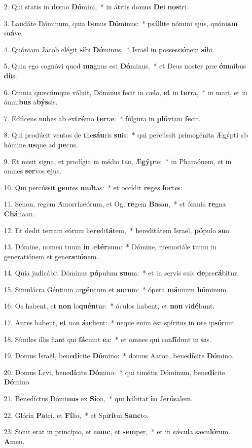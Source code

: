 2. Qui statis in \textbf{do}mo \textbf{Dó}mini,~*  in átriis domus \textbf{De}i \textbf{nos}tri.\

3. Laudáte Dóminum, quia \textbf{bo}nus \textbf{Dó}minus:~*  psállite nómini ejus, quóni\textbf{am} su\textbf{á}ve.\

4. Quóniam Jacob elégit \textbf{si}bi \textbf{Dó}minus,~*  Israël in possessi\textbf{ó}nem \textbf{si}bi.\

5. Quia ego cognóvi quod \textbf{ma}gnus est \textbf{Dó}minus,~*  et Deus noster præ \textbf{óm}nibus \textbf{di}is.\

6. Omnia quæcúmque vóluit, Dóminus fecit in cælo, \textbf{et} in \textbf{ter}ra,~*  in mari, et in ómni\textbf{bus} a\textbf{býs}sis.\

7. Edúcens nubes ab ex\textbf{tré}mo \textbf{ter}ræ:~*  fúlgura in \textbf{plú}viam \textbf{fe}cit.\

8. Qui prodúcit ventos de the\textbf{sáu}ris \textbf{su}is:~*  qui percússit primogénita Ægýpti ab hómine \textbf{us}que ad \textbf{pe}cus.\

9. Et misit signa, et prodígia in médio \textbf{tu}i, Æ\textbf{gýp}te:~*  in Pharaónem, et in omnes \textbf{ser}vos \textbf{e}jus.\

10. Qui percússit \textbf{gen}tes \textbf{mul}tas:~*  et occídit \textbf{re}ges \textbf{for}tes:\

11. Sehon, regem Amorrhæórum, et Og, \textbf{re}gem \textbf{Ba}san,~*  et ómnia \textbf{re}gna \textbf{Chá}naan.\

12. Et dedit terram eórum he\textbf{re}di\textbf{tá}tem,~*  hereditátem Israël, \textbf{pó}pulo \textbf{su}o.\

13. Dómine, nomen tuum \textbf{in} æ\textbf{tér}num:~*  Dómine, memoriále tuum in generatiónem et gene\textbf{ra}ti\textbf{ó}nem.\

14. Quia judicábit Dóminus \textbf{pó}pulum \textbf{su}um:~*  et in servis suis \textbf{de}pre\textbf{cá}bitur.\

15. Simulácra Géntium ar\textbf{gén}tum et \textbf{au}rum:~*  ópera \textbf{má}nuum \textbf{hó}minum.\

16. Os habent, et \textbf{non} lo\textbf{quén}tur:~*  óculos habent, et \textbf{non} vi\textbf{dé}bunt.\

17. Aures habent, \textbf{et} non \textbf{áu}dient:~*  neque enim est spíritus in \textbf{o}re ip\textbf{só}rum.\

18. Símiles illis fiant qui \textbf{fá}ciunt \textbf{e}a:~*  et omnes qui con\textbf{fí}dunt in \textbf{e}is.\

19. Domus Israël, bene\textbf{dí}cite \textbf{Dó}mino:~*  domus Aaron, bene\textbf{dí}cite \textbf{Dó}mino.\

20. Domus Levi, bene\textbf{dí}cite \textbf{Dó}mino:~*  qui timétis Dóminum, bene\textbf{dí}cite \textbf{Dó}mino.\

21. Benedíctus Dómi\textbf{nus} ex \textbf{Si}on,~*  qui hábitat \textbf{in} Je\textbf{rú}salem.\

22. Glória \textbf{Pa}tri, et \textbf{Fí}lio,~*  et Spi\textbf{rí}tui \textbf{Sanc}to.\

23. Sicut erat in princípio, et \textbf{nunc}, et \textbf{sem}per,~*  et in sǽcula sæcu\textbf{ló}rum. \textbf{A}men.\

